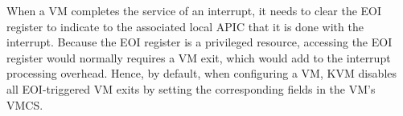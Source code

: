 When a VM completes the service of an interrupt, it needs to clear the EOI register to indicate to the
associated local APIC that it is done with the interrupt. Because the EOI register is a privileged resource, accessing the EOI register
would normally requires a VM exit, which would add to the interrupt processing overhead.
Hence, by default, when configuring a VM, KVM disables all EOI-triggered VM exits by setting the corresponding fields in the VM's VMCS.
